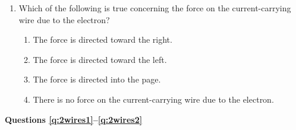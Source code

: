 \documentclass{../../../oss-classkick}
\begin{document}
\begin{multicols*}{2}
\begin{enumerate}[leftmargin=18pt]
  \item Which of the following is true concerning the force on the
    current-carrying wire due to the electron?
    \begin{center}
    \end{center}
    \begin{enumerate}[nosep,leftmargin=18pt,label=(\Alph*)]
    \item The force is directed toward the right.
    \item The force is directed toward the left.
    \item The force is directed into the page.
    \item There is no force on the current-carrying wire due to the electron.
    \end{enumerate}
  \end{enumerate}
  \textbf{Questions \ref{q:2wires1}--\ref{q:2wires2}}
  

\end{multicols*}
\end{document}
